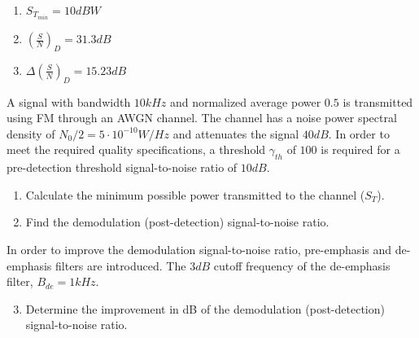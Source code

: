 \documentclass[es,boletin]{uah}
\begin{document}
{
\begin{enumerate}
	\item $S_{T_{min}} = 10dBW$
	\item $\left ( \frac{S}{N} \right )_D = 31.3 dB$
	\item $\Delta \left ( \frac{S}{N} \right )_D = 15.23 dB$
\end{enumerate}
}
{

	A signal with bandwidth $10 kHz$ and normalized average power $0.5$ is transmitted using FM through an AWGN channel. The channel has a noise power spectral density of $N_0/2=5\cdot 10^{-10} W/Hz$ and attenuates the signal $40 dB$. In order to meet the required quality specifications, a threshold $\gamma_{th}$ of $100$ is required for a pre-detection threshold signal-to-noise ratio of $10 dB$. 

	\begin{enumerate}
		\item Calculate the minimum possible power transmitted to the channel ($S_T$).
		\item Find the demodulation (post-detection) signal-to-noise ratio.
	\end{enumerate}
	 
In order to improve the demodulation signal-to-noise ratio, pre-emphasis and de-emphasis filters are introduced. The $3 dB$ cutoff frequency of the de-emphasis filter, $B_{de}= 1 kHz$.

\begin{enumerate}\setcounter{enumi}{2}
	\item Determine the improvement in dB of the demodulation (post-detection) signal-to-noise ratio.
\end{enumerate}

}
\end{document}
